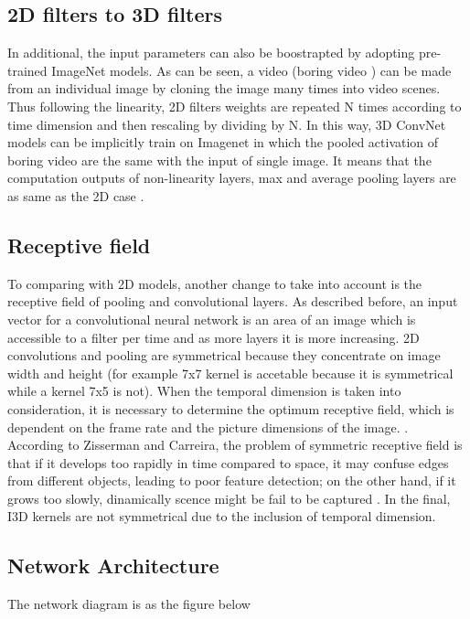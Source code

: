 \documentclass[a4paper, 12pt]{article}
\begin{document}
\subsection{2D filters to 3D filters}
In additional, the input parameters can also be boostrapted by adopting pre-trained ImageNet models. As can be seen, a video (boring video \citep{carreira2017quo}) can be made from an individual image by cloning the image many times into video scenes. Thus following the linearity, 2D filters weights are repeated N times according to time dimension and then rescaling by dividing by N. In this way, 3D ConvNet models can be implicitly train on Imagenet in which the pooled activation of boring video are the same with the input of single image. It means that the computation outputs of non-linearity layers, max and average pooling layers are as same as the 2D case \citep{mansimov2015initialization}.

\subsection{Receptive field}
To comparing with 2D models, another change to take into account is the receptive field of pooling and convolutional layers. As described before, an input vector for a convolutional neural network is an area of an image which is accessible to a filter per time and as more layers it is more increasing. 2D convolutions and pooling are symmetrical because they concentrate on image width and height (for example 7x7 kernel is accetable because it is symmetrical while a kernel 7x5 is not). When the temporal dimension is taken into consideration, it is necessary to determine the optimum receptive field, which is dependent on the frame rate and the picture dimensions of the image. \citep{towardScienceI3DUnderstanding}. According to Zisserman and Carreira, the problem of symmetric receptive field is that if it develops too rapidly in time compared to space, it may confuse edges from different objects, leading to poor feature detection; on the other hand, if it grows too slowly, dinamically scence might be fail to be captured \citep{carreira2017quo}. In the final, I3D kernels are not symmetrical due to the inclusion of temporal dimension.

\subsection{Network Architecture}
The network diagram is as the figure below \cite{carreira2017quo}
\end{document}
